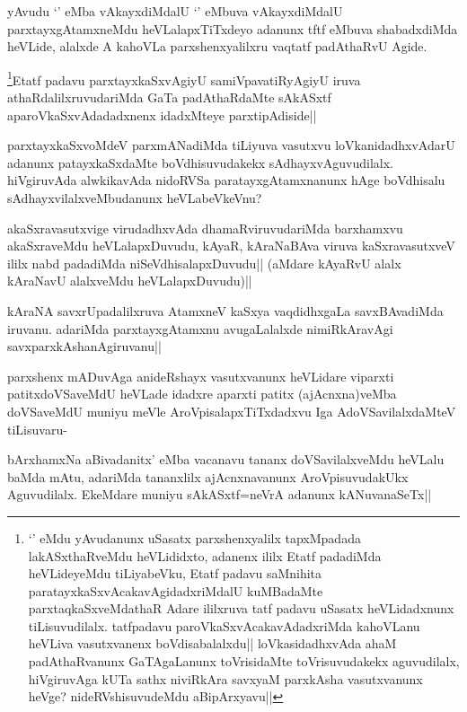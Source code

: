 
\begin{artha}
yAvudu `\stext ' eMba vAkayxdiMdalU `\stext ' eMbuva vAkayxdiMdalU parxtayxgAtamxneMdu heVLalapxTiTxdeyo adanunx tftf eMbuva shabadxdiMda heVLide, alalxde A kahoVLa parxshenxyalilxru vaqtatf padAthaRvU Agide.
\end{artha}

\begin{artha}
\footnote[1]{`\stext ' eMdu yAvudanunx uSasatx parxshenxyalilx tapxMpadada lakASxthaRveMdu heVLididxto, adanenx ililx Etatf padadiMda heVLideyeMdu tiLiyabeVku, Etatf padavu saMnihita paratayxkaSxvAcakavAgidadxriMdalU kuMBadaMte parxtaqkaSxveMdathaR Adare ililxruva tatf padavu uSasatx heVLidadxnunx tiLisuvudilalx. tatfpadavu paroVkaSxvAcakavAdadxriMda kahoVLanu heVLiva vasutxvanenx boVdisabalalxdu|| loVkasidadhxvAda ahaM padAthaRvanunx GaTAgaLanunx toVrisidaMte toVrisuvudakekx aguvudilalx, hiVgiruvAga kUTa sathx niviRkAra savxyaM parxkAsha vasutxvanunx heVge? nideRVshisuvudeMdu aBipArxyavu||}Etatf padavu parxtayxkaSxvAgiyU samiVpavatiRyAgiyU iruva athaRdalilxruvudariMda GaTa padAthaRdaMte sAkASxtf aparoVkaSxvAdadadxnenx idadxMteye parxtipAdiside||
\end{artha}


\begin{artha}
parxtayxkaSxvoMdeV parxmANadiMda tiLiyuva vasutxvu loVkanidadhxvAdarU adanunx patayxkaSxdaMte boVdhisuvudakekx sAdhayxvAguvudilalx. hiVgiruvAda alwkikavAda nidoRVSa paratayxgAtamxnanunx hAge boVdhisalu sAdhayxvilalxveMbudanunx heVLabeVkeVnu? 
\end{artha}


\begin{artha}
akaSxravasutxvige virudadhxvAda dhamaRviruvudariMda barxhamxvu akaSxraveMdu heVLalapxDuvudu, kAyaR, kAraNaBAva viruva kaSxravasutxveV ililx nabd padadiMda niSeVdhisalapxDuvudu|| (aMdare kAyaRvU alalx kAraNavU alalxveMdu heVLalapxDuvudu)||
\end{artha}


\begin{artha}
kAraNA savxrUpadalilxruva AtamxneV kaSxya vaqdidhxgaLa savxBAvadiMda iruvanu. adariMda parxtayxgAtamxnu avugaLalalxde nimiRkAravAgi savxparxkAshanAgiruvanu||

parxshenx mADuvAga anideRshayx vasutxvanunx heVLidare viparxti patitxdoVSaveMdU heVLade idadxre aparxti patitx (ajAcnxna)veMba doVSaveMdU muniyu meVle AroVpisalapxTiTxdadxvu Iga AdoVSavilalxdaMteV tiLisuvaru-
\end{artha}

\begin{artha}
bArxhamxNa aBivadanitx' eMba vacanavu tananx doVSavilalxveMdu heVLalu baMda mAtu, adariMda tananxlilx ajAcnxnavanunx AroVpisuvudakUkx Aguvudilalx. EkeMdare muniyu sAkASxtf=neVrA adanunx kANuvanaSeTx||
\end{artha}

\vishaya{}%

